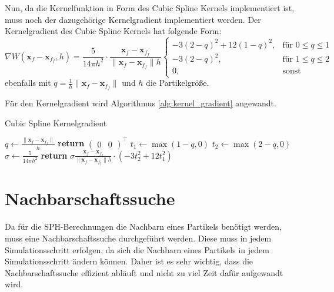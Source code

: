 \documentclass[11pt,
a4paper,
parskip=half, %
BCOR=10mm, %
english,
ngerman]{scrreprt}
\begin{document}
Nun, da die Kernelfunktion in Form des Cubic Spline Kernels implementiert ist, muss noch der dazugehörige Kernelgradient implementiert werden.
Der Kernelgradient des Cubic Spline Kernels hat folgende Form:
\begin{equation}
    \nabla W(\textbf{x}_f - \textbf{x}_{f_f}, h) = \frac{5}{14\pi h^2} \cdot \frac{\textbf{x}_f - \textbf{x}_{f_f}}{\|\textbf{x}_f - \textbf{x}_{f_f}\| h} \begin{cases}
        -3(2-q)^2 + 12(1-q)^2, &\text{für } 0 \leq q \leq 1\\
        -3(2-q)^2, &\text{für } 1 \leq q \leq 2\\
        0, &\text{sonst}
    \end{cases}
\end{equation}
ebenfalls mit $q = \frac{1}{h}\|\textbf{x}_f - \textbf{x}_{f_f}\|$ und $h$ die Partikelgröße.

Für den Kernelgradient wird Algorithmus \ref{alg:kernel_gradient} angewandt.
\begin{algorithm}
    \caption{Cubic Spline Kernelgradient}
    \label{alg:kernel_gradient}
    \begin{algorithmic}[1]
            \State $q \gets \frac{\|\textbf{x}_f - \textbf{x}_{f_f}\|}{h}$
                \State \textbf{return} $\begin{pmatrix}0 & 0 \end{pmatrix}^\intercal$
            \EndIf
            \State $t_1 \gets \max(1 - q, 0)$
            \State $t_2 \gets \max(2 - q, 0)$
            \State $\sigma \gets \frac{5}{14 \pi h^2}$
            \State \textbf{return} $\sigma \frac{\textbf{x}_f - \textbf{x}_{f_f}}{\|\textbf{x}_f - \textbf{x}_{f_f}\| h} \cdot (-3 t_2^2 + 12t_1^2)$
        \EndFunction
    \end{algorithmic}
\end{algorithm}


\section{Nachbarschaftssuche}
Da für die SPH-Berechnungen die Nachbarn eines Partikels benötigt werden, muss eine Nachbarschaftssuche durchgeführt werden.
Diese muss in jedem Simulationsschritt erfolgen, da sich die Nachbarn eines Partikels in jedem Simulationsschritt ändern können.
Daher ist es sehr wichtig, dass die Nachbarschaftssuche effizient abläuft und nicht zu viel Zeit dafür aufgewandt wird.
\end{document}
